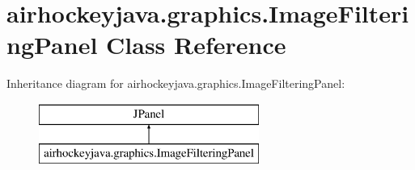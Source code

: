 \hypertarget{classairhockeyjava_1_1graphics_1_1_image_filtering_panel}{}\section{airhockeyjava.\+graphics.\+Image\+Filtering\+Panel Class Reference}
\label{classairhockeyjava_1_1graphics_1_1_image_filtering_panel}
Inheritance diagram for airhockeyjava.\+graphics.\+Image\+Filtering\+Panel\+:\begin{figure}[H]
\begin{center}
\leavevmode
\includegraphics[height=2.000000cm]{classairhockeyjava_1_1graphics_1_1_image_filtering_panel}
\end{center}
\end{figure}
